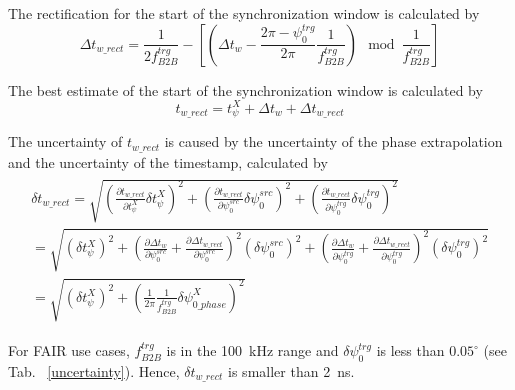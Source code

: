 The rectification for the start of the synchronization window is calculated by
\begin{equation}
\Delta t_\mathit{w\_rect}=\frac{1}{2f^\mathit{trg}_\mathit{B2B}}-[(\Delta t_\mathit{w} - \frac{2\pi-\psi^\mathit{trg}_0}{2\pi}\frac{1}{f^\mathit{trg}_\mathit{B2B}}) \mod \frac{1}{f^\mathit{trg}_\mathit{B2B}}]
\end{equation}

The best estimate of the start of the synchronization window is calculated by
\begin{equation}
t_\mathit{w\_rect}=t_\psi^\mathit{X}+\Delta t_\mathit{w}+\Delta t_\mathit{w\_rect}
\end{equation}

The uncertainty of $t_\mathit{w\_rect}$ is caused by the uncertainty of the phase extrapolation and the uncertainty of the timestamp, calculated by 
\begin{eqnarray}
\begin{aligned}
\delta t_\mathit{w\_rect} =\sqrt {(\frac {\partial t_\mathit{w\_rect}}{\partial t_\psi^\mathit{X}} \delta t_\psi^\mathit{X})^2 +(\frac {\partial t_\mathit{w\_rect}}{\partial \psi^\mathit{src}_0} \delta\psi^\mathit{src}_0)^2+(\frac {\partial t_\mathit{w\_rect}}{\partial \psi^\mathit{trg}_0} \delta\psi^\mathit{trg}_0)^2  }\\
=\sqrt {(\delta t_\psi^\mathit{X})^2 +(\frac {\partial \Delta t_\mathit{w}}{\partial \psi^\mathit{src}_0}+\frac {\partial \Delta t_\mathit{w\_rect}}{\partial \psi^\mathit{src}_0})^2 (\delta \psi^\mathit{src}_0)^2+(\frac {\partial \Delta t_\mathit{w}}{\partial \psi^\mathit{trg}_0}+\frac {\partial \Delta t_\mathit{w\_rect}}{\partial \psi^\mathit{trg}_0})^2 (\delta\psi^\mathit{trg}_0)^2 }\\
=\sqrt {(\delta t_\psi^\mathit{X})^2 + (\frac{1}{2\pi}\frac{1}{f^\mathit{trg}_\mathit{B2B}}\delta \psi^{X}_\mathit{0\_phase})^2}
\end{aligned}
\end{eqnarray}

For FAIR use cases, $f^\mathit{trg}_\mathit{B2B}$ is in the \SI{100}{kHz} range and $\delta\psi^\mathit{trg}_0$ is less than $0.05^\circ$ (see Tab. ~\ref{uncertainty}). Hence, $\delta t_\mathit{w\_rect}$ is smaller than \SI{2}{ns}. 

